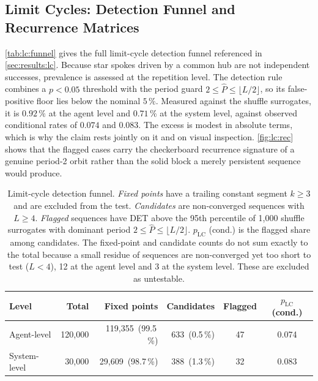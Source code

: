 \subsection{Limit Cycles: Detection Funnel and Recurrence Matrices}
\label{app:lc:supp}

\autoref{tab:lc:funnel} gives the full limit-cycle detection funnel referenced in
\autoref{sec:results:lc}. Because star spokes driven by a common hub are not
independent successes, prevalence is assessed at the repetition level. The
detection rule combines a $p < 0.05$ threshold with the period guard
$2 \leq \hat{P} \leq \lfloor L/2 \rfloor$, so its false-positive floor lies below
the nominal $5\,\%$. Measured against the shuffle surrogates, it is
$0.92\,\%$ at the agent level and
$0.71\,\%$ at the system level, against
observed conditional rates of $0.074$ and $0.083$. The excess is modest in
absolute terms, which is why the claim rests jointly on it and on visual
inspection. \autoref{fig:lc:rec} shows that the flagged cases carry the
checkerboard recurrence signature of a genuine period-2 orbit rather than the
solid block a merely persistent sequence would produce.

\begin{table}[H]
\centering
\small
\begin{tabular}{lrrrcc}
\toprule
Level & Total & Fixed points & Candidates & Flagged & $p_{\mathrm{LC}}$ (cond.) \\
\midrule
Agent-level  & 120{,}000 & 119{,}355~(99.5\,\%) &  633~(0.5\,\%) & 47 & 0.074 \\
System-level &  30{,}000 &  29{,}609~(98.7\,\%) &  388~(1.3\,\%) & 32 & 0.083 \\
\bottomrule
\end{tabular}
\caption[Limit-cycle detection funnel]{Limit-cycle detection funnel.
         \emph{Fixed points} have a trailing constant segment $k \geq 3$ and are excluded from
         the test. \emph{Candidates} are non-converged sequences with $L \geq 4$.
         \emph{Flagged} sequences have DET above the 95th percentile of 1{,}000 shuffle
         surrogates with dominant period
         $2 \leq \hat{P} \leq \lfloor L/2 \rfloor$.
         $p_{\mathrm{LC}}$ (cond.) is the flagged share among candidates.
         The fixed-point and candidate counts do not sum exactly to the total
         because a small residue of sequences are non-converged yet too short to
         test ($L < 4$), 12 at the agent level and 3 at the system level. These
         are excluded as untestable.}
\label{tab:lc:funnel}
\end{table}

